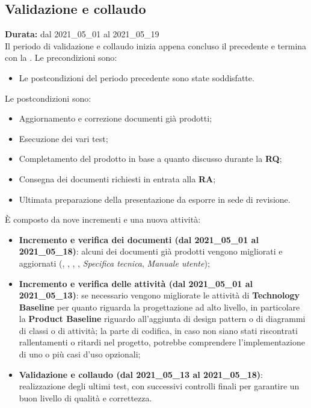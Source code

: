 \subsection{Validazione e collaudo}
\label{validazione_e_collaudo}
\textbf{Durata:} dal 2021\_05\_01 al 2021\_05\_19\\
Il periodo di validazione e collaudo inizia appena concluso il precedente e termina con la .
Le precondizioni sono:
\begin{itemize}
    \item Le postcondizioni del periodo precedente sono state soddisfatte.
\end{itemize}
Le postcondizioni sono:
\begin{itemize}
    \item Aggiornamento e correzione documenti già prodotti;
    \item Esecuzione dei vari test;
    \item Completamento del prodotto in base a quanto discusso durante la \textbf{RQ};
    \item Consegna dei documenti richiesti in entrata alla \textbf{RA};
    \item Ultimata preparazione della presentazione da esporre in sede di revisione.
\end{itemize}
È composto da nove incrementi e una nuova attività:
\begin{itemize}
    \item \textbf{Incremento e verifica dei documenti (dal 2021\_05\_01 al 2021\_05\_18)}: alcuni dei documenti già prodotti vengono migliorati e aggiornati ({\NdP}, {\PdP}, {\Glossario}, {\PdQ}, \textit{Specifica tecnica}, \textit{Manuale utente}); 
    \item \textbf{Incremento e verifica delle attività (dal 2021\_05\_01 al 2021\_05\_13)}: se necessario vengono migliorate le attività di \textbf{Technology Baseline} per quanto riguarda la progettazione ad alto livello, in particolare la \textbf{Product Baseline} riguardo all'aggiunta di design pattern o di diagrammi di classi o di attività; la parte di codifica, in caso non siano stati riscontrati rallentamenti o ritardi nel progetto, potrebbe comprendere l'implementazione di uno o più casi d'uso opzionali;
    \item \textbf{Validazione e collaudo (dal 2021\_05\_13 al 2021\_05\_18)}: realizzazione degli ultimi test, con successivi controlli finali per garantire un buon livello di qualità e correttezza.
\end{itemize}
